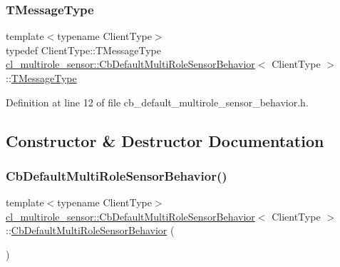 \subsubsection{\texorpdfstring{T\+Message\+Type}{TMessageType}}
{\footnotesize\ttfamily template$<$typename Client\+Type$>$ \\
typedef Client\+Type\+::\+T\+Message\+Type \hyperlink{classcl__multirole__sensor_1_1CbDefaultMultiRoleSensorBehavior}{cl\+\_\+multirole\+\_\+sensor\+::\+Cb\+Default\+Multi\+Role\+Sensor\+Behavior}$<$ Client\+Type $>$\+::\hyperlink{classcl__multirole__sensor_1_1CbDefaultMultiRoleSensorBehavior_aa23bc8c99de1eddad01d094bdab62aa4}{T\+Message\+Type}}



Definition at line 12 of file cb\+\_\+default\+\_\+multirole\+\_\+sensor\+\_\+behavior.\+h.



\subsection{Constructor \& Destructor Documentation}
\mbox{\label{classcl__multirole__sensor_1_1CbDefaultMultiRoleSensorBehavior_af4228e5fdc6401b13f66bb066c28ec39}} 
\subsubsection{\texorpdfstring{Cb\+Default\+Multi\+Role\+Sensor\+Behavior()}{CbDefaultMultiRoleSensorBehavior()}}
{\footnotesize\ttfamily template$<$typename Client\+Type$>$ \\
\hyperlink{classcl__multirole__sensor_1_1CbDefaultMultiRoleSensorBehavior}{cl\+\_\+multirole\+\_\+sensor\+::\+Cb\+Default\+Multi\+Role\+Sensor\+Behavior}$<$ Client\+Type $>$\+::\hyperlink{classcl__multirole__sensor_1_1CbDefaultMultiRoleSensorBehavior}{Cb\+Default\+Multi\+Role\+Sensor\+Behavior} (\begin{DoxyParamCaption}{ }\end{DoxyParamCaption})\hspace{0.3cm}{\ttfamily [inline]}}



